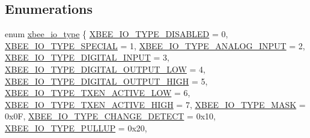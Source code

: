 \subsection*{Enumerations}
\begin{DoxyCompactItemize}
\item 
enum \hyperlink{group__xbee__io_gac23a55c53310f865d9ed2381e331a438}{xbee\+\_\+io\+\_\+type} \{ \newline
\hyperlink{group__xbee__io_ggac23a55c53310f865d9ed2381e331a438ac94eae0e1d6e2f048b7ce9aad2dbb294}{X\+B\+E\+E\+\_\+\+I\+O\+\_\+\+T\+Y\+P\+E\+\_\+\+D\+I\+S\+A\+B\+L\+ED} = 0, 
\hyperlink{group__xbee__io_ggac23a55c53310f865d9ed2381e331a438a03494dbb6cd4a96383107366370f0473}{X\+B\+E\+E\+\_\+\+I\+O\+\_\+\+T\+Y\+P\+E\+\_\+\+S\+P\+E\+C\+I\+AL} = 1, 
\hyperlink{group__xbee__io_ggac23a55c53310f865d9ed2381e331a438a70bf5092d9f6fdf00cb81b4fd16aeb8b}{X\+B\+E\+E\+\_\+\+I\+O\+\_\+\+T\+Y\+P\+E\+\_\+\+A\+N\+A\+L\+O\+G\+\_\+\+I\+N\+P\+UT} = 2, 
\hyperlink{group__xbee__io_ggac23a55c53310f865d9ed2381e331a438a2887707500afd7d22309447fef90d52e}{X\+B\+E\+E\+\_\+\+I\+O\+\_\+\+T\+Y\+P\+E\+\_\+\+D\+I\+G\+I\+T\+A\+L\+\_\+\+I\+N\+P\+UT} = 3, 
\newline
\hyperlink{group__xbee__io_ggac23a55c53310f865d9ed2381e331a438a4e6de8188ed6ccfea0d862dc8c36cbbf}{X\+B\+E\+E\+\_\+\+I\+O\+\_\+\+T\+Y\+P\+E\+\_\+\+D\+I\+G\+I\+T\+A\+L\+\_\+\+O\+U\+T\+P\+U\+T\+\_\+\+L\+OW} = 4, 
\hyperlink{group__xbee__io_ggac23a55c53310f865d9ed2381e331a438ab62aebd7dfbb2424407a9115fbf55ef1}{X\+B\+E\+E\+\_\+\+I\+O\+\_\+\+T\+Y\+P\+E\+\_\+\+D\+I\+G\+I\+T\+A\+L\+\_\+\+O\+U\+T\+P\+U\+T\+\_\+\+H\+I\+GH} = 5, 
\hyperlink{group__xbee__io_ggac23a55c53310f865d9ed2381e331a438a85bc0f69a521fb5c165328ff14cb3c93}{X\+B\+E\+E\+\_\+\+I\+O\+\_\+\+T\+Y\+P\+E\+\_\+\+T\+X\+E\+N\+\_\+\+A\+C\+T\+I\+V\+E\+\_\+\+L\+OW} = 6, 
\hyperlink{group__xbee__io_ggac23a55c53310f865d9ed2381e331a438a4a98244656eacb8587c39c6219b02731}{X\+B\+E\+E\+\_\+\+I\+O\+\_\+\+T\+Y\+P\+E\+\_\+\+T\+X\+E\+N\+\_\+\+A\+C\+T\+I\+V\+E\+\_\+\+H\+I\+GH} = 7, 
\newline
\hyperlink{group__xbee__io_ggac23a55c53310f865d9ed2381e331a438afb53ffa5963f9677a369d43916807f44}{X\+B\+E\+E\+\_\+\+I\+O\+\_\+\+T\+Y\+P\+E\+\_\+\+M\+A\+SK} = 0x0F, 
\hyperlink{group__xbee__io_ggac23a55c53310f865d9ed2381e331a438a2f8406584861bbcbd152bac72b6051c8}{X\+B\+E\+E\+\_\+\+I\+O\+\_\+\+T\+Y\+P\+E\+\_\+\+C\+H\+A\+N\+G\+E\+\_\+\+D\+E\+T\+E\+CT} = 0x10, 
\hyperlink{group__xbee__io_ggac23a55c53310f865d9ed2381e331a438a6338af6819290605a1c535a610965340}{X\+B\+E\+E\+\_\+\+I\+O\+\_\+\+T\+Y\+P\+E\+\_\+\+P\+U\+L\+L\+UP} = 0x20, 

\end{DoxyCompactItemize}
